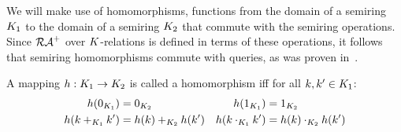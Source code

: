 We will make use of homomorphisms, functions from
the domain of a semiring $K_1$ to the domain of a semiring
$K_2$ %
that %
commute with the semiring operations.  Since $\mathcal{RA}^{+}$ over $K$-relations is defined in terms
of these operations, it follows that semiring homomorphisms commute
with queries, as was proven in~\cite{GK07}.

\begin{defi}[Homomorphism]
A mapping $h: K_1 \to K_2$
is called a homomorphism iff for all $k,k'\in K_1$:
\begin{align*}
h(0_{K_1}) &= 0_{K_2}
&h(1_{K_1}) &= 1_{K_2}\\
h(k +_{K_1} k') &= h(k) +_{K_2} h(k')
&h(k \cdot_{K_1} k') &= h(k) \cdot_{K_2} h(k')
\end{align*}
\end{defi}

